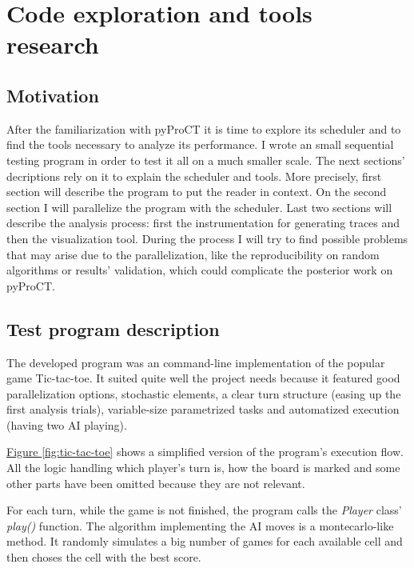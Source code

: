 \section{Code exploration and tools research}
\label{chap:ttt}

\subsection{Motivation}

After the familiarization with pyProCT it is time to explore its scheduler and to find the tools necessary to analyze its performance. I wrote an small sequential testing program in order to test it all on a much smaller scale. The next sections' decriptions rely on it to explain the scheduler and tools. More precisely, first section will describe the program to put the reader in context. On the second section I will parallelize the program with the scheduler. Last two sections will describe the analysis process: first the instrumentation for generating traces and then the visualization tool. During the process I will try to find possible problems that may arise due to the parallelization, like the reproducibility on random algorithms or results' validation, which could complicate the posterior work on pyProCT.


\subsection{Test program description}

The developed program was an command-line implementation of the popular game Tic-tac-toe. It suited quite well the project needs because it featured good parallelization options, stochastic elements, a clear turn structure (easing up the first analysis trials), variable-size parametrized tasks and automatized execution (having two AI playing).

\hyperref[fig:tic-tac-toe]{Figure \ref{fig:tic-tac-toe}} shows a simplified version of the program's execution flow. All the logic handling which player's turn is, how the board is marked and some other parts have been omitted because they are not relevant. 

For each turn, while the game is not finished, the program calls the \textit{Player} class' \textit{play()} function. The algorithm implementing the AI moves is a montecarlo-like method. It randomly simulates a big number of games for each available cell and then choses the cell with the best score.

